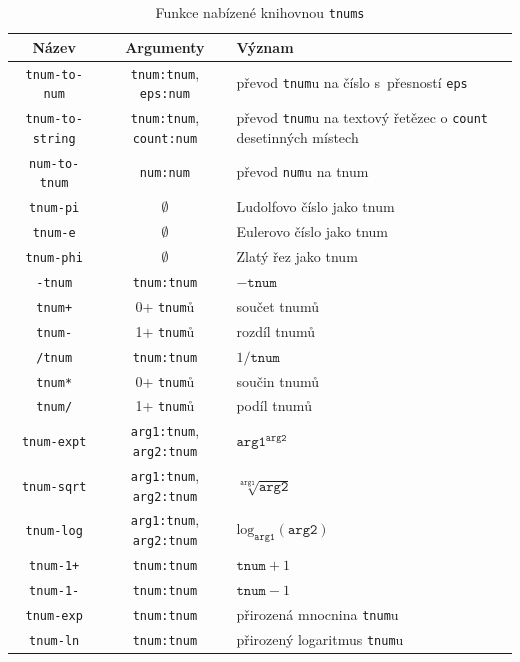 \begin{table}[H]
\begin{mdframed}[backgroundcolor=lightpink,innertopmargin=-2.5pt,innerbottommargin=2.5pt]
\centering
\caption{Funkce nabízené knihovnou \texttt{tnums}}
\label{tab:funkce_rozhrani}
\begin{tabular}{| >{\columncolor[gray]{1}} c |>{\columncolor[gray]{1}}c|>{\columncolor[gray]{1}}p{4.8cm}|}
\hline
Název & Argumenty & Význam\\ \hline \hline
\texttt{tnum-to-num} & \texttt{tnum:tnum}, \texttt{eps:num} & převod \texttt{tnum}u na číslo s~přesností \texttt{eps}\\
\texttt{tnum-to-string} & \texttt{tnum:tnum}, \texttt{count:num} & převod \texttt{tnum}u na textový řetězec o \texttt{count} desetinných místech\\\hline
\texttt{num-to-tnum}&\texttt{num:num}&převod \texttt{num}u na tnum\\
\texttt{tnum-pi}&$\emptyset$&Ludolfovo číslo jako tnum\\
\texttt{tnum-e}&$\emptyset$&Eulerovo číslo jako tnum\\
\texttt{tnum-phi}&$\emptyset$&Zlatý řez jako tnum\\\hline
\texttt{-tnum}&\texttt{tnum:tnum}&$-\texttt{tnum}$\\
\texttt{tnum+}&0+ \texttt{tnum}ů&součet tnumů\\
\texttt{tnum-}&1+ \texttt{tnum}ů&rozdíl tnumů\\
\texttt{/tnum}&\texttt{tnum:tnum}&$1/\texttt{tnum}$\\
\texttt{tnum*}&0+ \texttt{tnum}ů&součin tnumů\\
\texttt{tnum/}&1+ \texttt{tnum}ů&podíl tnumů\\
\texttt{tnum-expt}&\texttt{arg1:tnum}, \texttt{arg2:tnum}&$\texttt{arg1}^{\texttt{arg2}}$\\
\texttt{tnum-sqrt}&\texttt{arg1:tnum}, \texttt{arg2:tnum}&$\sqrt[\texttt{arg1}]{\texttt{arg2}}$\\
\texttt{tnum-log}&\texttt{arg1:tnum}, \texttt{arg2:tnum}&$\mathrm{log}_{\texttt{arg1}}(\texttt{arg2})$\\
\texttt{tnum-1+}&\texttt{tnum:tnum}&$\texttt{tnum} + 1$\\
\texttt{tnum-1-}&\texttt{tnum:tnum}&$\texttt{tnum} - 1$\\\hline
\texttt{tnum-exp}&\texttt{tnum:tnum}&přirozená mnocnina \texttt{tnum}u\\
\texttt{tnum-ln}&\texttt{tnum:tnum}&přirozený logaritmus \texttt{tnum}u\\

\end{tabular}
\end{mdframed}
\end{table}
